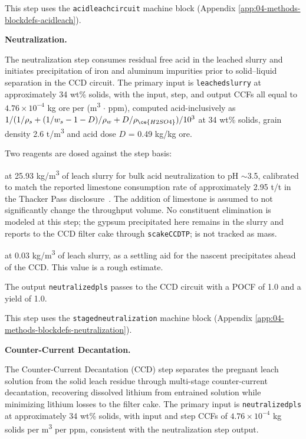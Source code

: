 \documentclass{article}
\renewcommand\_{\textunderscore\allowbreak}
\begin{document}
This step uses the \texttt{acid\_leach\_circuit} machine block (Appendix \ref{app:04-methods-blockdefs-acidleach}).

\medskip
\noindent\textbf{Neutralization.}\quad

The neutralization step consumes residual free acid in the leached slurry and initiates precipitation of iron and aluminum impurities prior to solid--liquid separation in the CCD circuit. The primary input is \texttt{leached\_slurry} at approximately 34 wt\% solids, with the input, step, and output CCFs all equal to $4.76 \times 10^{-4}$ kg ore per (\si{m^3} $\cdot$ ppm), computed acid-inclusively as $1/(1/\rho_s + (1/w_s - 1 - D)/\rho_w + D/\rho_{\ce{H2SO4}})/10^3$ at 34 wt\% solids, grain density 2.6 \si{t/m^3} and acid dose $D$ = 0.49 kg/kg ore. 

Two reagents are dosed against the step basis:
\begin{description}[noitemsep, topsep=0pt]
\item[\textbullet\enskip Limestone (\ce{CaCO3})] at 25.93 \si{kg/m^3} of leach slurry for bulk acid neutralization to pH $\sim$3.5, calibrated to match the reported limestone consumption rate of approximately 2.95 t/t  in the Thacker Pass disclosure~\cite{sgscanadaincSK1300Technical2024}. The addition of limestone is assumed to not significantly change the throughput volume. No constituent elimination is modeled at this step; the gypsum precipitated here remains in the slurry and reports to the CCD filter cake through \texttt{s\_cake\_CCD\_TP};  is not tracked as mass.
\item[\textbullet\enskip Flocculant] at 0.03 \si{kg/m^3} of leach slurry, as a settling aid for the nascent precipitates ahead of the CCD. This value is a rough estimate.
\end{description}

The output \texttt{neutralized\_pls} passes to the CCD circuit with a POCF of 1.0 and a yield of 1.0.

This step uses the \texttt{staged\_neutralization} machine block (Appendix \ref{app:04-methods-blockdefs-neutralization}).

\medskip
\noindent\textbf{Counter-Current Decantation.}\quad

The Counter-Current Decantation (CCD) step separates the pregnant leach solution from the solid leach residue through multi-stage counter-current decantation, recovering dissolved lithium from entrained solution while minimizing lithium losses to the filter cake. The primary input is \texttt{neutralized\_pls} at approximately 34 wt\% solids, with input and step CCFs of $4.76 \times 10^{-4}$ kg solids per \si{m^3} per ppm, consistent with the neutralization step output.
\end{document}
